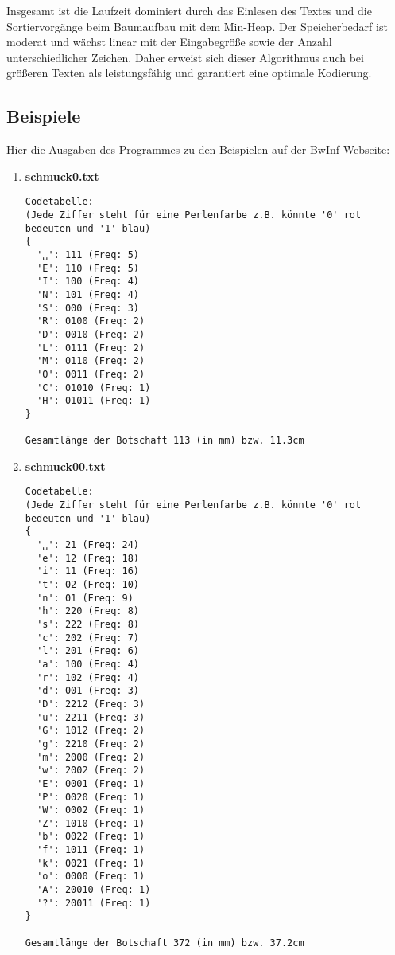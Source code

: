 \documentclass[a4paper,10pt,ngerman]{scrartcl}
\begin{document}
\vspace{1em}
Insgesamt ist die Laufzeit dominiert durch das Einlesen des Textes und die Sortiervorgänge beim Baumaufbau mit dem Min-Heap. Der Speicherbedarf ist moderat und wächst linear mit der Eingabegröße sowie der Anzahl unterschiedlicher Zeichen. 
\newline
Daher erweist sich dieser Algorithmus auch bei größeren Texten als leistungsfähig und garantiert eine optimale Kodierung.


\subsection{Beispiele}

Hier die Ausgaben des Programmes zu den Beispielen auf der BwInf-Webseite:

\begin{enumerate}
  \item \textbf{schmuck0.txt}
\begin{verbatim}
Codetabelle:
(Jede Ziffer steht für eine Perlenfarbe z.B. könnte '0' rot bedeuten und '1' blau)
{
  '␣': 111 (Freq: 5)
  'E': 110 (Freq: 5)
  'I': 100 (Freq: 4)
  'N': 101 (Freq: 4)
  'S': 000 (Freq: 3)
  'R': 0100 (Freq: 2)
  'D': 0010 (Freq: 2)
  'L': 0111 (Freq: 2)
  'M': 0110 (Freq: 2)
  'O': 0011 (Freq: 2)
  'C': 01010 (Freq: 1)
  'H': 01011 (Freq: 1)
}

Gesamtlänge der Botschaft 113 (in mm) bzw. 11.3cm
\end{verbatim}


\item \textbf{schmuck00.txt}
\begin{verbatim}
Codetabelle:
(Jede Ziffer steht für eine Perlenfarbe z.B. könnte '0' rot bedeuten und '1' blau)
{
  '␣': 21 (Freq: 24)
  'e': 12 (Freq: 18)
  'i': 11 (Freq: 16)
  't': 02 (Freq: 10)
  'n': 01 (Freq: 9)
  'h': 220 (Freq: 8)
  's': 222 (Freq: 8)
  'c': 202 (Freq: 7)
  'l': 201 (Freq: 6)
  'a': 100 (Freq: 4)
  'r': 102 (Freq: 4)
  'd': 001 (Freq: 3)
  'D': 2212 (Freq: 3)
  'u': 2211 (Freq: 3)
  'G': 1012 (Freq: 2)
  'g': 2210 (Freq: 2)
  'm': 2000 (Freq: 2)
  'w': 2002 (Freq: 2)
  'E': 0001 (Freq: 1)
  'P': 0020 (Freq: 1)
  'W': 0002 (Freq: 1)
  'Z': 1010 (Freq: 1)
  'b': 0022 (Freq: 1)
  'f': 1011 (Freq: 1)
  'k': 0021 (Freq: 1)
  'o': 0000 (Freq: 1)
  'A': 20010 (Freq: 1)
  '?': 20011 (Freq: 1)
}

Gesamtlänge der Botschaft 372 (in mm) bzw. 37.2cm
\end{verbatim}


\end{enumerate}
\end{document}
